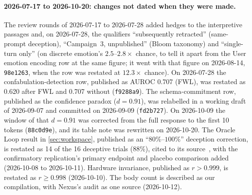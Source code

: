 \documentclass[11pt,a4paper]{article}
\begin{document}
\paragraph{2026-07-17 to 2026-10-20: changes not dated when they were made.}
The review rounds of 2026-07-17 to 2026-07-28 added hedges to the
interpretive passages and, on 2026-07-28, the qualifiers ``subsequently
retracted'' (same-prompt deception), ``Campaign~3, unpublished'' (Bloom
taxonomy) and ``single-turn only'' (on discrete emotion's
$2.5$--$2.8\times$ chance, to tell it apart from the User emotion
encoding row at the same figure; it went with that figure on
2026-08-14, \texttt{98e1263}, when the row was restated at
$12.3\times$ chance). On 2026-07-28 the
confabulation-detection row, published as AUROC 0.707 (FWL), was
restated as 0.620 after FWL and 0.707 without (\texttt{f9288a9}). The
schema-commitment row,
published as the confidence paradox ($d{=}0.91$), was relabelled in a
working draft of 2026-09-07 and committed on 2026-09-09
(\texttt{fd2b727}). On 2026-10-09 the window of that $d{=}0.91$ was
corrected from the full response to the first 10 tokens
(\texttt{88c0d9e}), and its table note was rewritten on 2026-10-20.
The Oracle Loop result in \cref{sec:workspace}, published as an
``$80\%$--$100\%$'' deception correction, is restated as 14 of the 16
deceptive trials (88\%), cited to its source~\citep{cc2026targeted},
with the confirmatory replication's primary endpoint and placebo
comparison added (2026-10-08 to 2026-10-11). Hardware invariance,
published as $r{>}0.999$, is restated as $r{\geq}0.998$ (2026-10-10).
The body count is described as our compilation, with Nexus's audit as
one source (2026-10-12).
\end{document}
